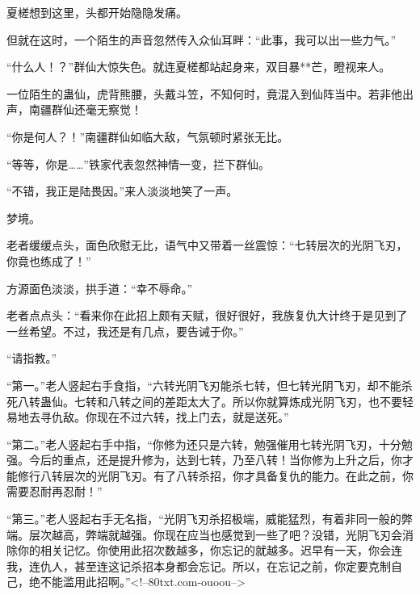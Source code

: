\begin{this_body}
夏槎想到这里，头都开始隐隐发痛。

但就在这时，一个陌生的声音忽然传入众仙耳畔：“此事，我可以出一些力气。”

“什么人！？”群仙大惊失色。就连夏槎都站起身来，双目暴**芒，瞪视来人。

一位陌生的蛊仙，虎背熊腰，头戴斗笠，不知何时，竟混入到仙阵当中。若非他出声，南疆群仙还毫无察觉！

“你是何人？！”南疆群仙如临大敌，气氛顿时紧张无比。

“等等，你是……”铁家代表忽然神情一变，拦下群仙。

“不错，我正是陆畏因。”来人淡淡地笑了一声。

梦境。

老者缓缓点头，面色欣慰无比，语气中又带着一丝震惊：“七转层次的光阴飞刃，你竟也练成了！”

方源面色淡淡，拱手道：“幸不辱命。”

老者点点头：“看来你在此招上颇有天赋，很好很好，我族复仇大计终于是见到了一丝希望。不过，我还是有几点，要告诫于你。”

“请指教。”

“第一。”老人竖起右手食指，“六转光阴飞刃能杀七转，但七转光阴飞刃，却不能杀死八转蛊仙。七转和八转之间的差距太大了。所以你就算炼成光阴飞刃，也不要轻易地去寻仇敌。你现在不过六转，找上门去，就是送死。”

“第二。”老人竖起右手中指，“你修为还只是六转，勉强催用七转光阴飞刃，十分勉强。今后的重点，还是提升修为，达到七转，乃至八转！当你修为上升之后，你才能修行八转层次的光阴飞刃。有了八转杀招，你才具备复仇的能力。在此之前，你需要忍耐再忍耐！”

“第三。”老人竖起右手无名指，“光阴飞刃杀招极端，威能猛烈，有着非同一般的弊端。层次越高，弊端就越强。你现在应当也感觉到一些了吧？没错，光阴飞刃会消除你的相关记忆。你使用此招次数越多，你忘记的就越多。迟早有一天，你会连我，连仇人，甚至连这记杀招本身都会忘记。所以，在忘记之前，你定要克制自己，绝不能滥用此招啊。”<!--80txt.com-ouoou-->

\end{this_body}

